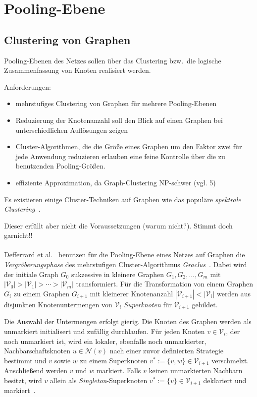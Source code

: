 \section{Pooling-Ebene}

\subsection{Clustering von Graphen}

Pooling-Ebenen des Netzes sollen über das Clustering bzw.\ die logische Zusammenfassung von Knoten realisiert werden.

Anforderungen:

\begin{itemize}
  \item mehrstufiges Clustering von Graphen für mehrere Pooling-Ebenen
  \item Reduzierung der Knotenanzahl soll den Blick auf einen Graphen bei unterschiedlichen Auflösungen zeigen
  \item Cluster-Algorithmen, die die Größe eines Graphen um den Faktor zwei für jede Anwendung reduzieren erlauben eine feine Kontrolle über die zu benutzenden Pooling-Größen.
  \item effiziente Approximation, da Graph-Clustering NP-schwer (vgl. 5)
\end{itemize}

Es existieren einige Cluster-Techniken auf Graphen wie das populäre \emph{spektrale Clustering}~\cite{Luxburg}. 

Dieser erfüllt aber nicht die Voraussetzungen (warum nicht?). Stimmt doch garnicht!!\\
\\

Defferrard et al.~\cite{Defferrard} benutzen für die Pooling-Ebene eines Netzes auf Graphen die \emph{Vergröberungsphase} des mehrstufigen Cluster-Algorithmus \emph{Graclus}~\cite{Dhillon}.
Dabei wird der initiale Graph $G_0$ sukzessive in kleinere Graphen $G_1, G_2, \ldots, G_m$ mit $|\mathcal{V}_0| > |\mathcal{V}_1| > \cdots > |\mathcal{V}_m|$ transformiert.
Für die Transformation von einem Graphen $G_i$ zu einem Graphen $G_{i+1}$ mit kleinerer Knotenanzahl $|\mathcal{V}_{i+1}| < |\mathcal{V}_i|$ werden aus disjunkten Knotenuntermengen von $\mathcal{V}_i$ \emph{Superknoten} für $\mathcal{V}_{i+1}$ gebildet.

Die Auswahl der Untermengen erfolgt gierig.
Die Knoten des Graphen werden als unmarkiert initialisert und zufällig durchlaufen.
Für jeden Knoten $v \in \mathcal{V}_i$, der noch unmarkiert ist, wird ein lokaler, ebenfalls noch unmarkierter, Nachbarschaftsknoten $u \in \mathcal{N}(v)$ nach einer zuvor definierten Strategie bestimmt und $v$ sowie $w$ zu einem Superknoten $v^* := \lbrace v, w \rbrace \in \mathcal{V}_{i+1}$ verschmelzt.
Anschließend werden $v$ und $w$ markiert.
Falls $v$ keinen unmarkierten Nachbarn besitzt, wird $v$ allein als \emph{Singleton}-Superknoten $v^* := \lbrace v \rbrace \in \mathcal{V}_{i+1}$ deklariert und markiert~\cite{Dhillon}.

